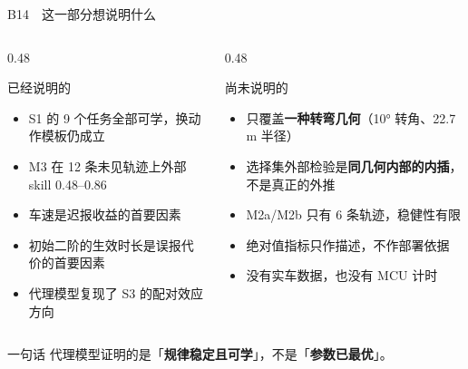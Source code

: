 \documentclass[aspectratio=169,10pt]{ctexbeamer}
\begin{document}
\begin{frame}{B14\ \ 这一部分想说明什么}
  \begin{columns}[T]
    \begin{column}{0.48\textwidth}
      \begin{block}{已经说明的}
        \footnotesize
        \begin{itemize}\setlength{\itemsep}{2pt}
          \item S1 的 9 个任务全部可学，换动作模板仍成立
          \item M3 在 12 条未见轨迹上外部 skill 0.48--0.86
          \item 车速是迟报收益的首要因素
          \item 初始二阶的生效时长是误报代价的首要因素
          \item 代理模型复现了 S3 的配对效应方向
        \end{itemize}
      \end{block}
    \end{column}
    \begin{column}{0.48\textwidth}
      \begin{alertblock}{尚未说明的}
        \footnotesize
        \begin{itemize}\setlength{\itemsep}{2pt}
          \item 只覆盖\textbf{一种转弯几何}（10° 转角、22.7\,m 半径）
          \item 选择集外部检验是\textbf{同几何内部的内插}，不是真正的外推
          \item M2a/M2b 只有 6 条轨迹，稳健性有限
          \item 绝对值指标只作描述，不作部署依据
          \item 没有实车数据，也没有 MCU 计时
        \end{itemize}
      \end{alertblock}
    \end{column}
  \end{columns}

  \vspace{0.5em}
  \begin{block}{一句话}
    \small 代理模型证明的是「\textbf{规律稳定且可学}」，不是「\textbf{参数已最优}」。
  \end{block}
\end{frame}
\end{document}
